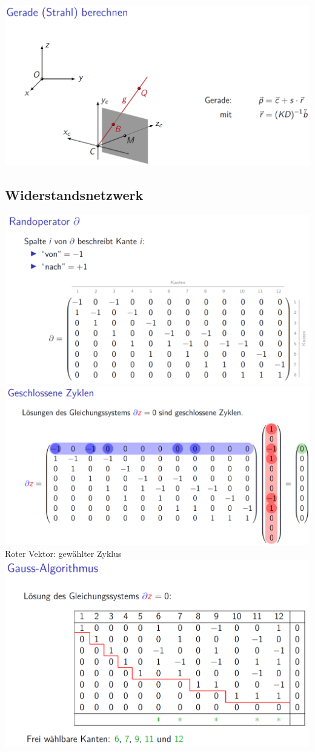 		 \includegraphics[width=0.9\linewidth]{Bilder/kamera4} 	 

	\subsection{Widerstandsnetzwerk}
		   \includegraphics[width=0.8\linewidth]{Bilder/widerstand2} \\ 
		   
		   \includegraphics[width=0.8\linewidth]{Bilder/widerstand3} \\ 
		   Roter Vektor: gewählter Zyklus\\
		   \includegraphics[width=0.8\linewidth]{Bilder/widerstand4} \\ 
		   
